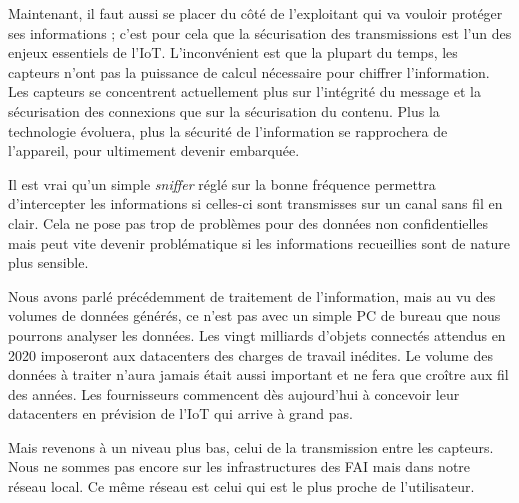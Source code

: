 
Maintenant, il faut aussi se placer du côté de l'exploitant qui va vouloir protéger ses informations ; c'est pour cela que la sécurisation des transmissions est l'un des enjeux essentiels de l'IoT. L'inconvénient est que la plupart du temps, les capteurs n'ont pas la puissance de calcul nécessaire pour chiffrer l'information. Les capteurs se concentrent actuellement plus sur l'intégrité du message et la sécurisation des connexions que sur la sécurisation du contenu. Plus la technologie évoluera, plus la sécurité de l'information se rapprochera de l'appareil, pour ultimement devenir embarquée. 

Il est vrai qu'un simple \textit{sniffer} réglé sur la bonne fréquence permettra d’intercepter les informations si celles-ci sont transmisses sur un canal sans fil en clair. Cela ne pose pas trop de problèmes pour des données non confidentielles mais peut vite devenir problématique si les informations recueillies sont de nature plus sensible.


Nous avons parlé précédemment de traitement de l'information, mais au vu des volumes de données générés, ce n'est pas avec un simple PC de bureau que nous pourrons analyser les données. Les vingt milliards d'objets connectés attendus en 2020 imposeront aux datacenters des charges de travail inédites. Le volume des données à traiter n'aura jamais était aussi important et ne fera que croître aux fil des années. Les fournisseurs commencent dès aujourd'hui à concevoir leur datacenters en prévision de l'IoT qui arrive à grand pas.

Mais revenons à un niveau plus bas, celui de la transmission entre les capteurs. Nous ne sommes pas encore sur les infrastructures des FAI mais dans notre réseau local. Ce même réseau est celui qui est le plus proche de l'utilisateur. 


